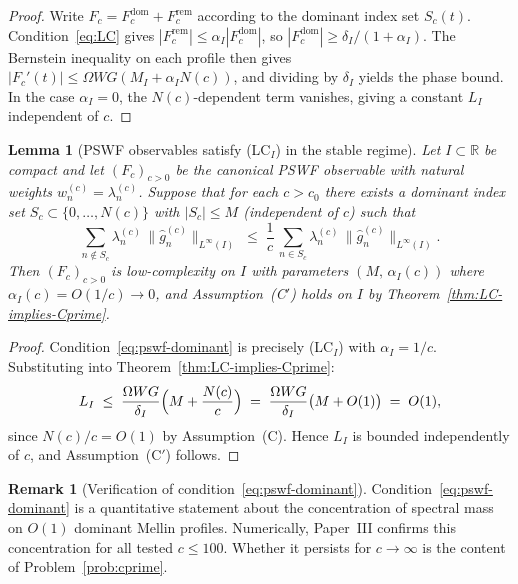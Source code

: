 \documentclass[12pt,a4paper]{amsart}
\newtheorem{lemma}[theorem]{Lemma}
\theoremstyle{definition}
\newtheorem{remark}[theorem]{Remark}
\begin{document}
\begin{proof}
Write $F_c = F_c^{\mathrm{dom}}
+ F_c^{\mathrm{rem}}$ according to the dominant index
set $S_c(t)$. Condition~\eqref{eq:LC} gives
$|F_c^{\mathrm{rem}}|
\le \alpha_I |F_c^{\mathrm{dom}}|$, so
$|F_c^{\mathrm{dom}}|
\ge \delta_I/(1+\alpha_I)$.
The Bernstein inequality on each profile then gives
$|F_c'(t)|
\le \Omega WG(M_I + \alpha_I N(c))$, and
dividing by $\delta_I$ yields the phase bound.
In the case $\alpha_I = 0$, the $N(c)$-dependent
term vanishes, giving a constant $L_I$ independent
of $c$.
\end{proof}

\begin{lemma}[PSWF observables satisfy
\textnormal{(LC$_I$)} in the stable regime]
\label{lem:pswf-LC}
Let $I \subset \mathbb{R}$ be compact and let
$(F_c)_{c>0}$ be the canonical PSWF observable with
natural weights $w_n^{(c)} = \lambda_n^{(c)}$.
Suppose that for each $c > c_0$ there exists a
dominant index set
$S_c \subset \{0,\ldots,N(c)\}$ with
$|S_c| \le M$ (independent of $c$) such that
\begin{equation}
\label{eq:pswf-dominant}
\sum_{n \notin S_c}
\lambda_n^{(c)}\,
\|\widehat{g}_n^{(c)}\|_{L^\infty(I)}
\;\le\;
\frac{1}{c}\,
\sum_{n \in S_c}
\lambda_n^{(c)}\,
\|\widehat{g}_n^{(c)}\|_{L^\infty(I)}.
\end{equation}
Then $(F_c)_{c>0}$ is low-complexity on $I$ with
parameters $(M,\, \alpha_I(c))$ where
$\alpha_I(c) = O(1/c) \to 0$, and
Assumption~\textnormal{(C$'$)} holds on $I$ by
Theorem~\ref{thm:LC-implies-Cprime}.
\end{lemma}

\begin{proof}
Condition~\eqref{eq:pswf-dominant} is precisely
\textnormal{(LC$_I$)} with $\alpha_I = 1/c$.
Substituting into
Theorem~\ref{thm:LC-implies-Cprime}:
\[
L_I
\;\le\;
\frac{\Omega W G}{\delta_I}
\Bigl(M + \frac{N(c)}{c}\Bigr)
\;=\;
\frac{\Omega W G}{\delta_I}
\bigl(M + O(1)\bigr)
\;=\; O(1),
\]
since $N(c)/c = O(1)$ by Assumption~(C). Hence $L_I$
is bounded independently of $c$, and
Assumption~(C$'$) follows.
\end{proof}

\begin{remark}[Verification of
condition~\eqref{eq:pswf-dominant}]
\label{rem:pswf-LC-verification}
Condition~\eqref{eq:pswf-dominant} is a quantitative
statement about the concentration of spectral mass on
$O(1)$ dominant Mellin profiles. Numerically,
Paper~III confirms this concentration for all tested
$c \le 100$. Whether it persists for $c \to \infty$
is the content of Problem~\ref{prob:cprime}.
\end{remark}
\end{document}
